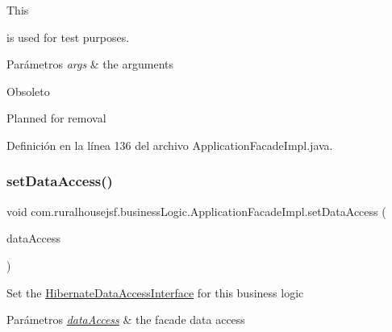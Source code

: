 This
\begin{DoxyCode}{0}
\end{DoxyCode}
 is used for test purposes.


\begin{DoxyParams}{Parámetros}
{\em args} & the arguments\\
\hline
\end{DoxyParams}
\begin{DoxyRefDesc}{Obsoleto}
\item[\mbox{\hyperlink{deprecated__deprecated000001}{Obsoleto}}]Planned for removal \end{DoxyRefDesc}


Definición en la línea 136 del archivo Application\+Facade\+Impl.\+java.

\mbox{\label{classcom_1_1ruralhousejsf_1_1business_logic_1_1_application_facade_impl_a78fc6968b9fec7aa475b322463b6bd92}} 
\subsubsection{\texorpdfstring{setDataAccess()}{setDataAccess()}}
{\footnotesize\ttfamily void com.\+ruralhousejsf.\+business\+Logic.\+Application\+Facade\+Impl.\+set\+Data\+Access (\begin{DoxyParamCaption}\item[{\mbox{\hyperlink{interfacecom_1_1ruralhousejsf_1_1data_access_1_1_hibernate_data_access_interface}{Hibernate\+Data\+Access\+Interface}}}]{data\+Access }\end{DoxyParamCaption})}

Set the \mbox{\hyperlink{}{Hibernate\+Data\+Access\+Interface}} for this business logic


\begin{DoxyParams}{Parámetros}
{\em \mbox{\hyperlink{namespacecom_1_1ruralhousejsf_1_1data_access}{data\+Access}}} & the facade data access \\
\hline
\end{DoxyParams}



